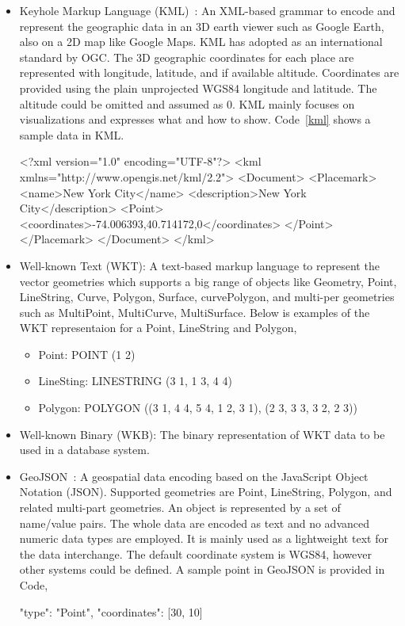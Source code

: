\documentclass[a4paper,12pt]{article}
\begin{document}
\begin{itemize}
\item Keyhole Markup Language (KML)~\cite{kml}: An XML-based grammar to encode and represent the geographic data in an 3D earth viewer such as Google Earth, also on a 2D map like Google Maps. KML has adopted as an international standard by OGC. The 3D geographic coordinates for each place are represented with longitude, latitude, and if available altitude. Coordinates are provided using the plain unprojected WGS84 longitude and latitude. The altitude could be omitted and assumed as $0$. KML mainly focuses on visualizations and expresses what and how to show. Code~\ref{kml} shows a sample data in KML. 
\vspace{10px}
\begin{fakeXML}[label=kml,caption=A simple KML example representing a Point]
<?xml version="1.0" encoding="UTF-8"?>
<kml xmlns="http://www.opengis.net/kml/2.2">
<Document>
<Placemark>
  <name>New York City</name>
  <description>New York City</description>
  <Point>
    <coordinates>-74.006393,40.714172,0</coordinates>
  </Point>
</Placemark>
</Document>
</kml>
\end{fakeXML} 
\vspace{10px}
\item Well-known Text (WKT): A text-based markup language to represent the vector geometries which supports a big range of objects like Geometry, Point, LineString, Curve, Polygon, Surface, curvePolygon, and multi-per geometries such as MultiPoint, MultiCurve, MultiSurface. Below is examples of the WKT representaion for a Point, LineString and Polygon,
\begin{itemize}
\item Point: POINT (1 2)
\item LineSting: LINESTRING (3 1, 1 3, 4 4)
\item Polygon: POLYGON ((3 1, 4 4, 5 4, 1 2, 3 1),
			(2 3, 3 3, 3 2, 2 3))
\end{itemize}
\item Well-known Binary (WKB): The binary representation of WKT data to be used in a database system.
\item GeoJSON~\cite{www/geojson}: A geospatial data encoding based on the JavaScript Object Notation (JSON). Supported geometries are Point, LineString, Polygon, and related multi-part geometries. An object is represented by a set of name/value pairs. The whole data are encoded as text and no advanced numeric data types are employed. It is mainly used as a lightweight text for the data interchange. The default coordinate system is WGS84, however other systems could be defined. A sample point in GeoJSON is provided in Code,
\vspace{10px} 
\begin{fakeXML}[label=wkb,caption=A simple WKB example representing a Point]
{
    "type": "Point", 
    "coordinates": [30, 10]
}
\end{fakeXML}
\vspace{10px}
\end{itemize}
\end{document}
